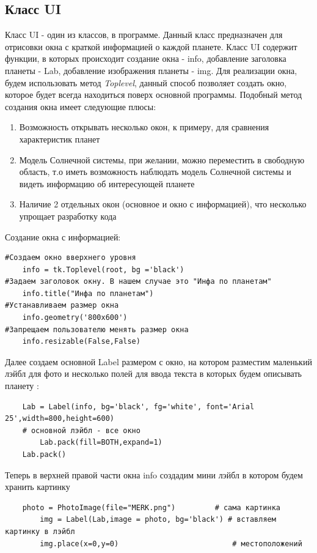 \documentclass[11pt,a4paper]{report}
\begin{document}
\subsection{Класс UI}

Класс UI - один из классов, в программе. Данный класс предназначен для отрисовки окна с краткой информацией о каждой планете.
Класс UI содержит функции, в которых происходит создание окна  - info, добавление заголовка планеты - Lab, добавление изображения планеты - img. 
Для реализации окна, будем использовать метод \textit{Toplevel}, данный способ позволяет создать окно, которое будет всегда находиться поверх основной программы. 
Подобный метод создания окна имеет следующие плюсы:
\begin{enumerate}
    \item Возможность открывать несколько окон, к примеру, для сравнения характеристик планет
    \item Модель Солнечной системы, при желании, можно переместить в свободную область, т.о иметь возможность наблюдать модель Солнечной системы и видеть информацию об интересующей планете
    \item Наличие 2 отдельных окон (основное и окно с информацией), что несколько упрощает разработку кода
\end{enumerate}
Создание окна с информацией:
\begin{verbatim}
#Создаем окно вверхнего уровня
    info = tk.Toplevel(root, bg ='black')
#Задаем заголовок окну. В нашем случае это "Инфа по планетам"
    info.title("Инфа по планетам")
#Устанавливаем размер окна
    info.geometry('800x600')
#Запрещаем пользователю менять размер окна
    info.resizable(False,False)
\end{verbatim}
Далее создаем основной   Label размером с окно, на котором разместим маленький лэйбл для фото и несколько полей для ввода текста в которых будем описывать планету :
\begin{verbatim}
    Lab = Label(info, bg='black', fg='white', font='Arial 25',width=800,height=600)
    # основной лэйбл - все окно
        Lab.pack(fill=BOTH,expand=1)
    Lab.pack()
\end{verbatim}
Теперь в верхней правой части окна info создадим  мини лэйбл  в котором будем хранить картинку 
\begin{verbatim}
    photo = PhotoImage(file="MERK.png")         # сама картинка
        img = Label(Lab,image = photo, bg='black') # вставляем картинку в лэйбл
        img.place(x=0,y=0)                          # местоположений
\end{verbatim}        
\end{document}
